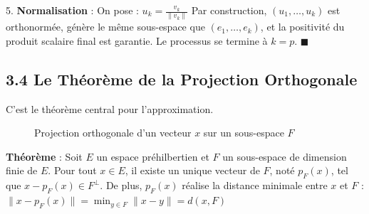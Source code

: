 \documentclass{report}
\begin{document}
5. \textbf{Normalisation} : On pose :
   $ u_k = \frac{v_k}{\|v_k\|} $
   Par construction, $(u_1, \ldots, u_k)$ est orthonormée, génère le même sous-espace que $(e_1, \ldots, e_k)$, et la positivité du produit scalaire final est garantie. Le processus se termine à $k=p$.
   $\blacksquare$

\subsection*{3.4 Le Théorème de la Projection Orthogonale}

C'est le théorème central pour l'approximation.

\begin{figure}[h]
\centering
{}
\caption{Projection orthogonale d'un vecteur $x$ sur un sous-espace $F$}
\end{figure}


\textbf{Théorème} :
Soit $E$ un espace préhilbertien et $F$ un sous-espace de dimension finie de $E$. Pour tout $x \in E$, il existe un unique vecteur de $F$, noté $p_F(x)$, tel que $x - p_F(x) \in F^\perp$.
De plus, $p_F(x)$ réalise la distance minimale entre $x$ et $F$ :
$ \|x - p_F(x)\| = \min_{y \in F} \|x - y\| = d(x, F) $
\end{document}
